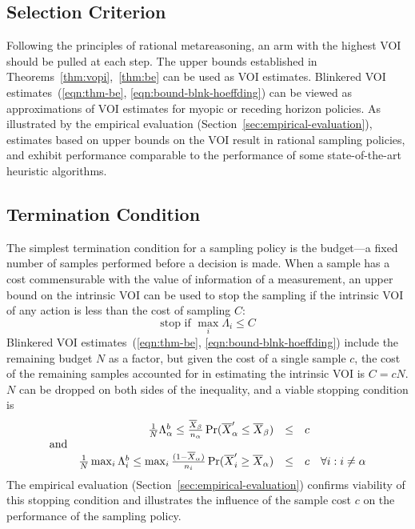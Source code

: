 \documentclass{article}
\begin{document}
\subsection{Selection Criterion}

Following the principles of rational metareasoning, an arm with
the highest VOI should be pulled at each step. The upper bounds
established in Theorems~\ref{thm:vopi},~\ref{thm:be} can be used
as VOI estimates. Blinkered VOI estimates~(\ref{eqn:thm-be},
 \ref{eqn:bound-blnk-hoeffding}) can be viewed
as approximations of VOI estimates for myopic or
receding horizon policies. As illustrated by the empirical evaluation
(Section~\ref{sec:empirical-evaluation}), estimates based on upper
bounds on the VOI result in rational sampling policies, and exhibit
performance comparable to the performance of some state-of-the-art
heuristic algorithms.

\subsection{Termination Condition}
\label{sec:control-termination-condition}

The simplest termination condition for a sampling policy is the
budget---a fixed number of samples performed before a decision is
made. When a sample has a cost commensurable with the value of
information of a measurement, an upper bound on the intrinsic VOI can
be used to stop the sampling if the intrinsic VOI of any action
is less than the cost of sampling $C$:
\begin{equation}
\mbox{stop if } \max_i \Lambda_i \le C
\end{equation}
Blinkered VOI estimates~(\ref{eqn:thm-be},
\ref{eqn:bound-blnk-hoeffding}) include the remaining budget $N$ as a
factor, but given the cost of a single sample $c$, the cost of the
remaining samples accounted for in estimating the intrinsic VOI is
$C=cN$. $N$ can be dropped on both sides of the inequality,
and a viable stopping condition is
\begin{equation}
\begin{array}{c r r l l}
&\frac 1 N \Lambda_\alpha^b
\le\frac {\overline  X_\beta} {n_\alpha}\Pr(\overline X_\alpha'\le\overline X_\beta)&\le& c
&\nonumber\\
\mbox{and}&&&&\nonumber\\
&\frac 1 N \max_i\Lambda_i^b
\le \max_i\frac {(1-\overline  X_\alpha)} {n_i}\Pr(\overline X_i'\ge\overline X_\alpha)&\le& c
 & \forall i: i\ne\alpha
\end{array}
\label{eqn:stopping-blnk}
\end{equation}
The empirical evaluation (Section~\ref{sec:empirical-evaluation})
confirms viability of this stopping condition and illustrates the
influence of the sample cost $c$ on the performance of
the sampling policy.
\end{document}
